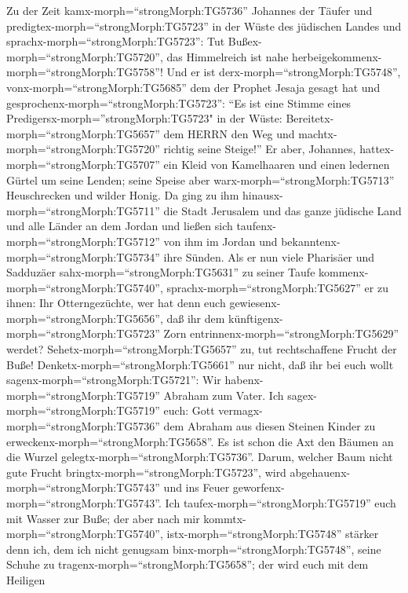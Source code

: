  Zu der Zeit kamx-morph=``strongMorph:TG5736'' Johannes der
Täufer und predigtex-morph=``strongMorph:TG5723'' in der Wüste des
jüdischen Landes  und sprachx-morph=``strongMorph:TG5723'':
Tut Bußex-morph=``strongMorph:TG5720'', das Himmelreich ist nahe
herbeigekommenx-morph=``strongMorph:TG5758''!  Und er ist
derx-morph=``strongMorph:TG5748'', vonx-morph=``strongMorph:TG5685'' dem
der Prophet Jesaja gesagt hat und
gesprochenx-morph=``strongMorph:TG5723'': ``Es ist eine Stimme eines
Predigersx-morph=''strongMorph:TG5723" in der Wüste:
Bereitetx-morph=``strongMorph:TG5657'' dem HERRN den Weg und
machtx-morph=``strongMorph:TG5720'' richtig seine Steige!'' 
Er aber, Johannes, hattex-morph=``strongMorph:TG5707'' ein Kleid von
Kamelhaaren und einen ledernen Gürtel um seine Lenden; seine Speise aber
warx-morph=``strongMorph:TG5713'' Heuschrecken und wilder Honig.
 Da ging zu ihm hinausx-morph=``strongMorph:TG5711'' die
Stadt Jerusalem und das ganze jüdische Land und alle Länder an dem
Jordan  und ließen sich taufenx-morph=``strongMorph:TG5712''
von ihm im Jordan und bekanntenx-morph=``strongMorph:TG5734'' ihre
Sünden.  Als er nun viele Pharisäer und Sadduzäer
sahx-morph=``strongMorph:TG5631'' zu seiner Taufe
kommenx-morph=``strongMorph:TG5740'',
sprachx-morph=``strongMorph:TG5627'' er zu ihnen: Ihr Otterngezüchte,
wer hat denn euch gewiesenx-morph=``strongMorph:TG5656'', daß ihr dem
künftigenx-morph=``strongMorph:TG5723'' Zorn
entrinnenx-morph=``strongMorph:TG5629'' werdet? 
Sehetx-morph=``strongMorph:TG5657'' zu, tut rechtschaffene Frucht der
Buße!  Denketx-morph=``strongMorph:TG5661'' nur nicht, daß
ihr bei euch wollt sagenx-morph=``strongMorph:TG5721'': Wir
habenx-morph=``strongMorph:TG5719'' Abraham zum Vater. Ich
sagex-morph=``strongMorph:TG5719'' euch: Gott
vermagx-morph=``strongMorph:TG5736'' dem Abraham aus diesen Steinen
Kinder zu erweckenx-morph=``strongMorph:TG5658''.  Es ist
schon die Axt den Bäumen an die Wurzel
gelegtx-morph=``strongMorph:TG5736''. Darum, welcher Baum nicht gute
Frucht bringtx-morph=``strongMorph:TG5723'', wird
abgehauenx-morph=``strongMorph:TG5743'' und ins Feuer
geworfenx-morph=``strongMorph:TG5743''.  Ich
taufex-morph=``strongMorph:TG5719'' euch mit Wasser zur Buße; der aber
nach mir kommtx-morph=``strongMorph:TG5740'',
istx-morph=``strongMorph:TG5748'' stärker denn ich, dem ich nicht
genugsam binx-morph=``strongMorph:TG5748'', seine Schuhe zu
tragenx-morph=``strongMorph:TG5658''; der wird euch mit dem Heiligen
